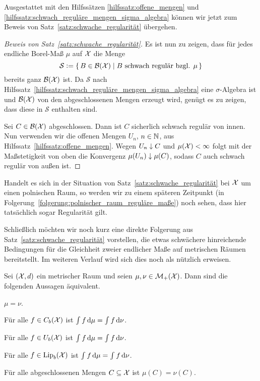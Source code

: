 \documentclass[../thesis/thesis.tex]{subfiles}
\begin{document}
	Ausgestattet mit den Hilfssätzen \ref{hilfssatz:offene_mengen} und \ref{hilfssatz:schwach_reguläre_mengen_sigma_algebra} können wir jetzt zum Beweis von Satz~\ref{satz:schwache_regularität} 
	übergehen.
	
	\begin{proof}[Beweis von Satz~\ref{satz:schwache_regularität}]
		Es ist nun zu zeigen, dass für jedes endliche Borel-Maß $\mu$ auf $\mathcal{X}$
		die Menge 
		$$\mathcal{S} \vcentcolon = \left\{\, B \in \mathcal{B}(\mathcal{X}) \; \middle| \; B \text{ schwach regulär bzgl. } \mu \,\right\}$$
		bereits ganz $\mathcal{B}(\mathcal{X})$ ist. 
		Da $\mathcal{S}$ nach Hilfssatz~\ref{hilfssatz:schwach_reguläre_mengen_sigma_algebra} eine 
		$\sigma$-Algebra ist und 
		$\mathcal{B}(\mathcal{X})$ von den abgeschlossenen Mengen erzeugt wird, genügt es zu zeigen, 
		dass diese in $\mathcal{S}$ enthalten sind. 
		
		Sei $C \in \mathcal{B}(\mathcal{X})$ abgeschlossen. Dann ist $C$ sicherlich schwach regulär von innen. 
		Nun verwenden wir die offenen Mengen $U_n$, $n \in \mathbb{N}$, aus 
		Hilfssatz~\ref{hilfssatz:offene_mengen}. 
		Wegen $U_n \downarrow C$ und $\mu(\mathcal{X}) < \infty$ folgt mit der 
		Maßstetigkeit von oben die Konvergenz $\mu(U_n) \downarrow \mu(C)$,
		sodass $C$ auch schwach regulär von außen ist.
	\end{proof}

	\begin{Bemerkung}
		Handelt es sich in der Situation von Satz~\ref{satz:schwache_regularität} bei $\mathcal{X}$ um einen polnischen Raum, 
		so werden wir zu einem späteren Zeitpunkt (in Folgerung~\ref{folgerung:polnischer_raum_reguläre_maße}) noch sehen, dass hier tatsächlich sogar Regularität gilt.
	\end{Bemerkung}
	
	Schließlich möchten wir noch kurz eine direkte Folgerung aus Satz~\ref{satz:schwache_regularität} vorstellen, die etwas 
	schwächere hinreichende Bedingungen für die Gleichheit 
	zweier endlicher Maße auf metrischen Räumen bereitstellt. Im weiteren Verlauf 
	wird sich dies noch als nützlich erweisen.
	
	\begin{Folgerung}
		\label{folgerung:gleichheit_von_maßen}
		Sei $(\mathcal{X},d)$ ein metrischer Raum und seien $\mu, \nu \in \mathcal{M}_{+}(\mathcal{X})$. 
		Dann sind die folgenden Aussagen äquivalent.
		\begin{equivalentthm}
			\item $\mu = \nu$.
			\item Für alle $f \in C_b(\mathcal{X})$ ist
			$\int_{} \, f \, \mathrm{d}\mu = \int_{} \, f \, \mathrm{d}\nu$.
			\item Für alle $f \in U_b(\mathcal{X})$ ist
			$\int_{} \, f \, \mathrm{d}\mu = \int_{} \, f \, \mathrm{d}\nu$.
			\item Für alle $f \in \mathrm{Lip}_b(\mathcal{X})$ ist
			$\int_{} \, f \, \mathrm{d}\mu = \int_{} \, f \, \mathrm{d}\nu$.
			\item Für alle abgeschlossenen Mengen $C \subseteq \mathcal{X}$ ist $\mu(C) = \nu(C)$.
		\end{equivalentthm}
	\end{Folgerung}
	
\end{document}
